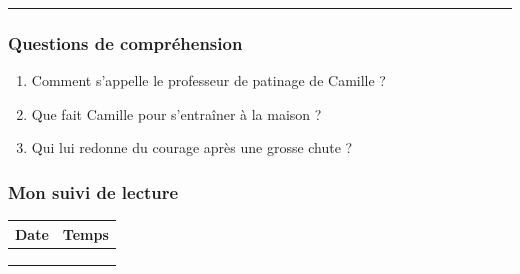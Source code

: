 \documentclass[
  french,
  french,
  14pt,
  a4paper]{extarticle}
\providecommand{\tightlist}{%
  \setlength{\itemsep}{0pt}\setlength{\parskip}{0pt}}
\begin{document}
{\begin{center}\rule{0.5\linewidth}{0.5pt}\end{center}

\subsubsection{Questions de
compréhension}\label{questions-de-compruxe9hension-10}

\begin{enumerate}
\def\labelenumi{\arabic{enumi}.}
\tightlist
\item
  Comment s'appelle le professeur de patinage de Camille ?
\item
  Que fait Camille pour s'entraîner à la maison ?
\item
  Qui lui redonne du courage après une grosse chute ?
\end{enumerate}

\subsubsection{Mon suivi de lecture}\label{mon-suivi-de-lecture-10}

\begin{center}
\begin{tabularx}{\textwidth}{|X|X|}
\hline
\textbf{Date} & \textbf{Temps} \\
\hline
& \\
\hline
& \\
\hline
& \\
\hline
\end{tabularx}
\end{center}

}%
\newpage
\end{document}
